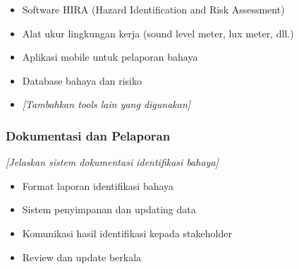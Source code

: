 \begin{itemize}
    \item Software HIRA (Hazard Identification and Risk Assessment)
    \item Alat ukur lingkungan kerja (sound level meter, lux meter, dll.)
    \item Aplikasi mobile untuk pelaporan bahaya
    \item Database bahaya dan risiko
    \item \textit{[Tambahkan tools lain yang digunakan]}
\end{itemize}

\vspace{0.5cm}

\subsubsection{Dokumentasi dan Pelaporan}

\textit{[Jelaskan sistem dokumentasi identifikasi bahaya]}

\begin{itemize}
    \item Format laporan identifikasi bahaya
    \item Sistem penyimpanan dan updating data
    \item Komunikasi hasil identifikasi kepada stakeholder
    \item Review dan update berkala
\end{itemize}

